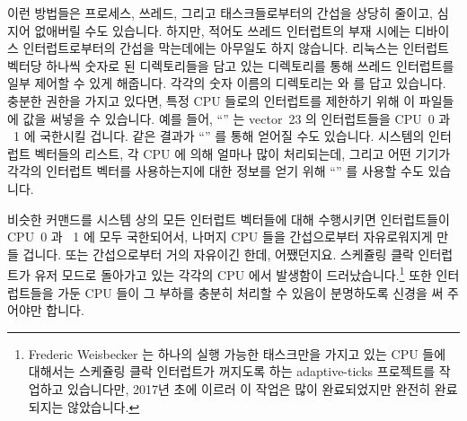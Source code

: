 이런 방법들은 프로세스, 쓰레드, 그리고 태스크들로부터의 간섭을 상당히 줄이고,
심지어 없애버릴 수도 있습니다.
하지만, 적어도 쓰레드 인터럽트의 부재 시에는 디바이스 인터럽트로부터의 간섭을
막는데에는 아무일도 하지 않습니다.
리눅스는 인터럽트 벡터당 하나씩 숫자로 된 디렉토리들을 담고 있는
 디렉토리를 통해 쓰레드 인터럽트를 일부 제어할 수 있게
해줍니다.
각각의 숫자 이름의 디렉토리는  와  를
답고 있습니다.
충분한 권한을 가지고 있다면, 특정 CPU 들로의 인터럽트를 제한하기 위해 이
파일들에 값을 써넣을 수 있습니다.
예를 들어, ``'' 는 vector~23 의
인터럽트들을 CPU~0 과 ~1 에 국한시킬 겁니다.
같은 결과가 ``'' 를 통해
얻어질 수도 있습니다.
시스템의 인터럽트 벡터들의 리스트, 각 CPU 에 의해 얼마나 많이 처리되는데,
그리고 어떤 기기가 각각의 인터럽트 벡터를 사용하는지에 대한 정보를 얻기 위해
``'' 를 사용할 수도 있습니다.

비슷한 커맨드를 시스템 상의 모든 인터럽트 벡터들에 대해 수행시키면 인터럽트들이
CPU~0 과 ~1 에 모두 국한되어서, 나머지 CPU 들을 간섭으로부터 자유로워지게 만들
겁니다.
또는 간섭으로부터 거의 자유이긴 한데, 어쨌던지요.
스케쥴링 클락 인터럽트가 유저 모드로 돌아가고 있는 각각의 CPU 에서 발생함이
드러났습니다.\footnote{
	Frederic Weisbecker 는 하나의 실행 가능한 태스크만을 가지고 있는 CPU
	들에 대해서는 스케쥴링 클락 인터럽트가 꺼지도록 하는 
	adaptive-ticks 프로젝트를 작업하고 있습니다만, 2017년 초에 이르러 이
	작업은 많이 완료되었지만 완전히 완료되지는 않았습니다.
}
또한 인터럽트들을 가둔 CPU 들이 그 부하를 충분히 처리할 수 있음이 분명하도록
신경을 써 주어야만 합니다.
\iffalse

